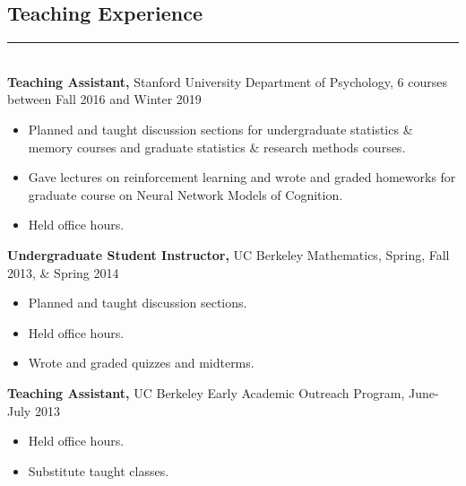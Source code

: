 \documentclass[margin]{res}
\begin{document}
\begin{resume}
\vspace{1pt}\section{Teaching Experience} \vspace{-15pt} \rule{\textwidth}{0.5pt} \\[3pt]
{\bf Teaching Assistant,} Stanford University Department of Psychology, 6 courses between Fall 2016 and Winter 2019
\begin{itemize} \itemsep -2pt
  \item Planned and taught discussion sections for undergraduate statistics \& memory courses and graduate statistics \& research methods courses. \item Gave lectures on reinforcement learning and wrote and graded homeworks for graduate course on Neural Network Models of Cognition. \item Held office hours. \end{itemize}\vspace{-8pt}
{\bf Undergraduate Student Instructor,} UC Berkeley Mathematics, Spring, Fall 2013, \& Spring 2014 
\begin{itemize} \itemsep -2pt
  \item Planned and taught discussion sections. \item Held office hours. \item Wrote and graded quizzes and midterms. \end{itemize}\vspace{-8pt}
{\bf Teaching Assistant,} UC Berkeley Early Academic Outreach Program, June-July 2013
\begin{itemize} \itemsep -2pt
 \item Held office hours. \item Substitute taught classes. \end{itemize}


\end{resume}
\end{document}
